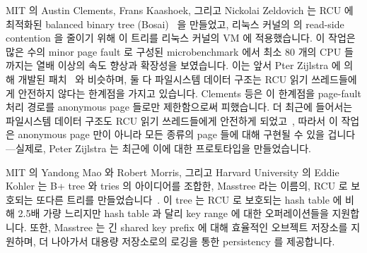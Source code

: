 MIT 의 Austin Clements, Frans Kaashoek, 그리고 Nickolai Zeldovich 는 RCU 에
최적화된 balanced binary tree (Bosai)~\cite{AustinClements2012RCULinux:mmapsem}
을 만들었고, 리눅스 커널의  의 read-side contention 을 줄이기 위해
이 트리를 리눅스 커널의 VM 에 적용했습니다.
이 작업은 많은 수의 minor page fault 로 구성된 microbenchmark 에서 최소 80 개의
CPU 들까지는 열배 이상의 속도 향상과 확장성을 보였습니다.
이는 앞서 Pter Zijlstra 에 의해 개발된
패치~\cite{PeterZijlstra2014SpeculativePageFault} 와 비슷하며, 둘 다 파일시스템
데이터 구조는 RCU 읽기 쓰레드들에게 안전하지 않다는 한계점을 가지고 있습니다.
Clements 등은 이 한계점을 page-fault 처리 경로를 anonymous page 들로만
제한함으로써 피했습니다.
더 최근에 들어서는 파일시스템 데이터 구조도 RCU 읽기 쓰레드들에게 안전하게
되었고~\cite{JonathanCorbet2010dcacheRCU,JonathanCorbet2011dcacheRCUbug},
따라서 이 작업은 anonymous page 만이 아니라 모든 종류의 page 들에 대해 구현될
수 있을 겁니다---실제로, Peter Zijlstra 는 최근에 이에 대한 프로토타입을
만들었습니다.
\iffalse

Austin Clements, Frans Kaashoek, and Nickolai Zeldovich
of MIT created an RCU-optimized balanced binary tree
(Bonsai)~\cite{AustinClements2012RCULinux:mmapsem}, and applied this
tree to the Linux kernel's VM subsystem in order to reduce read-side
contention on the Linux kernel's \co{mmap_sem}.
This work resulted in order-of-magnitude speedups and scalability up to
at least 80 CPUs for a microbenchmark featuring large numbers of minor
page faults.
This is similar to a patch developed earlier by
Peter Zijlstra~\cite{PeterZijlstra2014SpeculativePageFault}, and both
were limited by the fact that, at the time, filesystem data structures
were not safe for RCU readers.
Clements et al. avoided this limitation by optimizing the page-fault
path for anonymous pages only.
More recently, filesystem data structures have been made safe for RCU
readers~\cite{JonathanCorbet2010dcacheRCU,JonathanCorbet2011dcacheRCUbug},
so perhaps this work can be implemented for all page types, not just
anonymous pages---Peter Zijlstra has, in fact, recently prototyped
exactly this.
\fi

MIT 의 Yandong Mao 와 Robert Morris, 그리고 Harvard University 의 Eddie Kohler
는 B+ tree 와 tries 의 아이디어를 조합한, Masstree 라는 이름의, RCU 로 보호되는
또다른 트리를 만들었습니다~\cite{Mao:2012:CCF:2168836.2168855}.
이 tree 는 RCU 로 보호되는 hash table 에 비해 2.5배 가량 느리지만 hash table 과
달리 key range 에 대한 오퍼레이션들을 지원합니다.
또한, Masstree 는 긴 shared key prefix 에 대해 효율적인 오브젝트 저장소를
지원하며, 더 나아가서 대용량 저장소로의 로깅을 통한 persistency 를 제공합니다.

